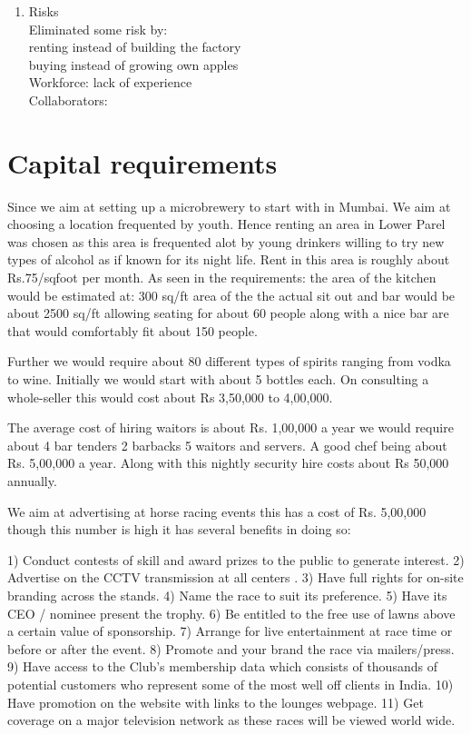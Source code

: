 \documentclass{article}
\begin{document}
\begin{enumerate}
\item Risks \\
Eliminated some risk by:\\
	renting instead of building the factory\\
	buying instead of growing own apples\\
Workforce: lack of experience\\
Collaborators: \\
	\end{enumerate}



\section{Capital requirements}

Since we aim at setting up a microbrewery to start with in Mumbai. We aim at choosing a location frequented by youth.
Hence renting an area in Lower Parel was chosen as this area is frequented alot by young drinkers willing to try new types of alcohol as if known for its night life.
Rent in this area is roughly about Rs.75/sqfoot per month. 
As seen in the requirements:
the area of the kitchen would be estimated at: 300 sq/ft
area of the the actual sit out and bar would be about 2500 sq/ft allowing seating for about 60 people along with a nice bar are that would comfortably fit about 150 people. 

Further we would require about 80 different types of spirits ranging from vodka to wine. Initially we would start with about 5 bottles each. On consulting a whole-seller this would cost about Rs 3,50,000 to 4,00,000.

The average cost of hiring waitors is about Rs. 1,00,000 a year we would require about 4 bar tenders 2 barbacks 5 waitors and servers.  
A good chef being about Rs. 5,00,000 a year.
Along with this nightly security hire costs about Rs 50,000 annually.

We aim at advertising at horse racing events this has a cost of Rs. 5,00,000 though this number is high it has several benefits in doing so:

1) Conduct contests of skill and award prizes to the public to generate interest.
2) Advertise on the CCTV transmission at all centers .
3) Have full rights for on-site branding across the stands.
4) Name the race to suit its preference.
5) Have its CEO / nominee present the trophy.
6) Be entitled to the free use of lawns above a certain value of sponsorship.
7) Arrange for live entertainment at race time or before or after the event.
8) Promote and your brand the race via mailers/press.
9) Have access to the Club's membership data which consists of thousands of potential customers who represent some of the most well off clients in India.
10) Have promotion on the website with links to the lounges webpage.
11) Get coverage on a major television network as these races will be viewed world wide.
\end{document}
